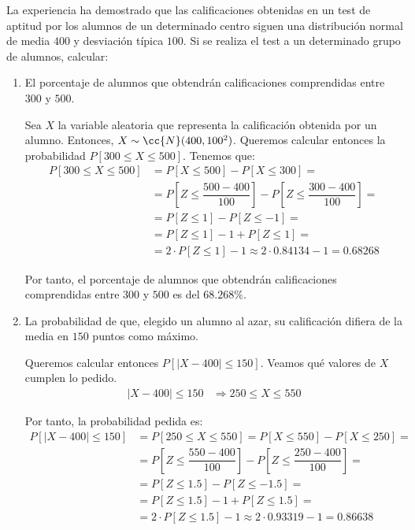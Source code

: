 \begin{ejercicio}
    La experiencia ha demostrado que las calificaciones obtenidas en un test de aptitud por los alumnos de un determinado centro siguen una distribución normal de media $400$ y desviación típica $100$. Si se realiza el test a un determinado grupo de alumnos, calcular:
    \begin{enumerate}
        \item El porcentaje de alumnos que obtendrán calificaciones comprendidas entre $300$ y $500$.
        
        Sea $X$ la variable aleatoria que representa la calificación obtenida por un alumno. Entonces, $X\sim \cc{N}(400,100^2)$.
        Queremos calcular entonces la probabilidad $P[300\leq X\leq 500]$. Tenemos que:
        \begin{align*}
            P[300\leq X\leq 500] &= P\left[X\leq 500\right] - P\left[X\leq 300\right] =\\&= P\left[Z\leq \dfrac{500-400}{100}\right] - P\left[Z\leq \dfrac{300-400}{100}\right] =\\&= P\left[Z\leq 1\right] - P\left[Z\leq -1\right] =\\&= P\left[Z\leq 1\right] - 1 + P\left[Z\leq 1\right] =\\&= 
            2\cdot P\left[Z\leq 1\right] - 1 \approx 2\cdot 0.84134 - 1 = 0.68268
        \end{align*}

        Por tanto, el porcentaje de alumnos que obtendrán calificaciones comprendidas entre $300$ y $500$ es del $68.268\%$.
        \item La probabilidad de que, elegido un alumno al azar, su calificación difiera de la media en $150$ puntos como máximo.
        
        Queremos calcular entonces $P[|X-400|\leq 150]$. Veamos qué valores de $X$ cumplen lo pedido.
        \begin{align*}
            |X-400|\leq 150 &\Longrightarrow 250\leq X\leq 550
        \end{align*}

        Por tanto, la probabilidad pedida es:
        \begin{align*}
            P[|X-400|\leq 150] &= P[250\leq X\leq 550] = P\left[X\leq 550\right] - P\left[X\leq 250\right] =\\&= P\left[Z\leq \dfrac{550-400}{100}\right] - P\left[Z\leq \dfrac{250-400}{100}\right] =\\&= P\left[Z\leq 1.5\right] - P\left[Z\leq -1.5\right] =\\&= P\left[Z\leq 1.5\right] - 1 + P\left[Z\leq 1.5\right] =\\&= 
            2\cdot P\left[Z\leq 1.5\right] - 1 \approx 2\cdot 0.93319 - 1 = 0.86638
        \end{align*}

    \end{enumerate}
\end{ejercicio}

